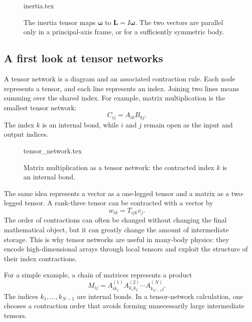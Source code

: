 \begin{figure}[htb]
    \centering
    {inertia.tex}
    \caption{The inertia tensor maps $\boldsymbol{\omega}$ to $\mathbf{L}=I\boldsymbol{\omega}$. The two vectors are parallel only in a principal-axis frame, or for a sufficiently symmetric body.}
    \label{fig:vec-inertia}
\end{figure}

\subsection{A first look at tensor networks}
A tensor network is a diagram and an associated contraction rule. Each node represents a tensor, and each line represents an index. Joining two lines means summing over the shared index. For example, matrix multiplication is the smallest tensor network:
\begin{equation}
C_{ij}=A_{ik}B_{kj}.
\end{equation}
The index $k$ is an internal bond, while $i$ and $j$ remain open as the input and output indices.

\begin{figure}[htb]
    \centering
    {tensor_network.tex}
    \caption{Matrix multiplication as a tensor network: the contracted index $k$ is an internal bond.}
    \label{fig:vec-tensor-network}
\end{figure}

The same idea represents a vector as a one-legged tensor and a matrix as a two-legged tensor. A rank-three tensor can be contracted with a vector by
\begin{equation}
w_{ik}=T_{ijk}v_j.
\end{equation}
The order of contractions can often be changed without changing the final mathematical object, but it can greatly change the amount of intermediate storage. This is why tensor networks are useful in many-body physics: they encode high-dimensional arrays through local tensors and exploit the structure of their index contractions.

For a simple example, a chain of matrices represents a product
\begin{equation}
M_{ij}=A^{(1)}_{ik_1}A^{(2)}_{k_1k_2}\cdots A^{(N)}_{k_{N-1}j}.
\end{equation}
The indices $k_1,\ldots,k_{N-1}$ are internal bonds. In a tensor-network calculation, one chooses a contraction order that avoids forming unnecessarily large intermediate tensors.
